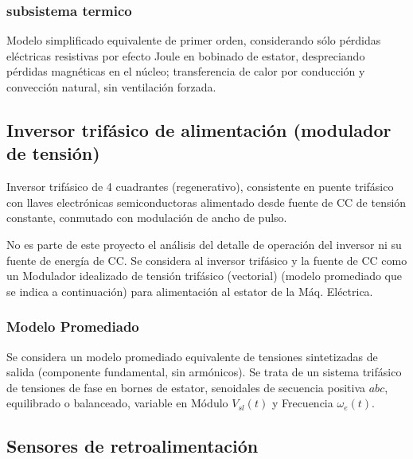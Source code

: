 \documentclass[a4paper, 10pt, onecolumn,journal]{ieeeconf}
\begin{document}
\vspace*{0.2cm}
\subsubsection{\textbf{subsistema termico}} Modelo simplificado equivalente de primer orden, considerando sólo pérdidas
eléctricas resistivas por efecto Joule en bobinado de estator, despreciando pérdidas magnéticas
en el núcleo; transferencia de calor por conducción y convección natural, sin ventilación forzada.

\subsection{\textbf{Inversor trifásico de alimentación (modulador de tensión)}}

Inversor trifásico de 4 cuadrantes (regenerativo), consistente en puente trifásico con llaves electrónicas semiconductoras alimentado desde fuente de CC de tensión constante, conmutado con modulación de ancho de pulso.

No es parte de este proyecto el análisis del detalle de operación del inversor ni su fuente de energía de CC. Se considera al inversor trifásico y la fuente de CC como un Modulador idealizado de tensión trifásico (vectorial) (modelo promediado que se indica a continuación) para alimentación al estator de la Máq. Eléctrica.

\vspace*{0.2cm}
\subsubsection{\textbf{Modelo Promediado}}
Se considera un modelo promediado equivalente de tensiones sintetizadas de salida (componente fundamental, sin armónicos). Se trata de un sistema trifásico de tensiones de fase en bornes de estator, senoidales de secuencia positiva $abc$, equilibrado o balanceado, variable en Módulo $V_{sl}(t)$ y Frecuencia $\omega_e(t)$.

\subsection{\textbf{Sensores de retroalimentación}}
\end{document}
